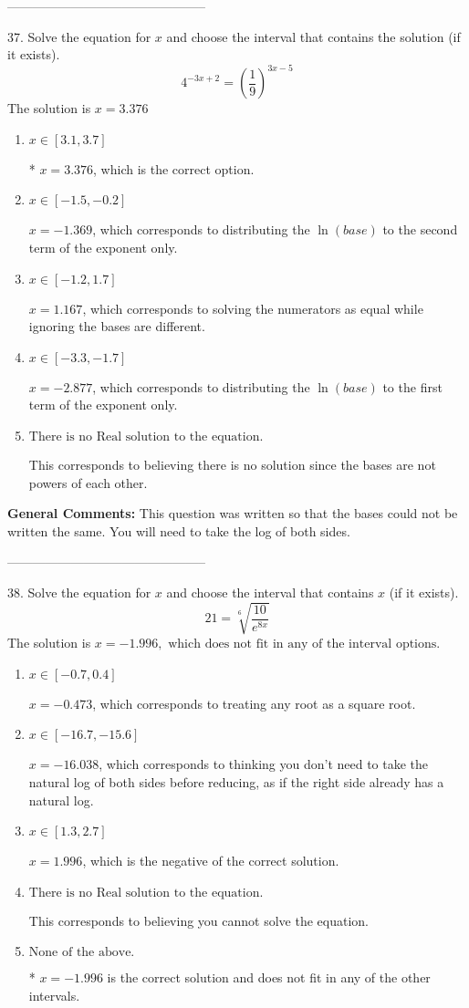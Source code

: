 \documentclass{article}[14pt]
\begin{document}
-----------------------------------------------

37. Solve the equation for $x$ and choose the interval that contains the solution (if it exists).
$$ 4^{-3x+2} = \left(\frac{1}{9}\right)^{3x-5} $$ 
The solution is $ x = 3.376 $ 

\begin{enumerate}[label=\Alph*.] 
\item $ x \in [3.1, 3.7] $ 

 * $x = 3.376$, which is the correct option. 
\item $ x \in [-1.5, -0.2] $ 

 $x = -1.369$, which corresponds to distributing the $\ln(base)$ to the second term of the exponent only. 
\item $ x \in [-1.2, 1.7] $ 

 $x = 1.167$, which corresponds to solving the numerators as equal while ignoring the bases are different. 
\item $ x \in [-3.3, -1.7] $ 

 $x = -2.877$, which corresponds to distributing the $\ln(base)$ to the first term of the exponent only. 
\item $ \text{There is no Real solution to the equation.} $ 

 This corresponds to believing there is no solution since the bases are not powers of each other. 
\end{enumerate} 
 
\textbf{General Comments:} This question was written so that the bases could not be written the same. You will need to take the log of both sides.

-----------------------------------------------

38.  Solve the equation for $x$ and choose the interval that contains $x$ (if it exists).
$$  21 = \sqrt[6]{\frac{10}{e^{8x}}} $$ 
The solution is $ x = -1.996, \text{ which does not fit in any of the interval options.} $ 

\begin{enumerate}[label=\Alph*.] 
\item $ x \in [-0.7, 0.4] $ 

 $x = -0.473$, which corresponds to treating any root as a square root. 
\item $ x \in [-16.7, -15.6] $ 

 $x = -16.038$, which corresponds to thinking you don't need to take the natural log of both sides before reducing, as if the right side already has a natural log. 
\item $ x \in [1.3, 2.7] $ 

 $x = 1.996$, which is the negative of the correct solution. 
\item $ \text{There is no Real solution to the equation.} $ 

 This corresponds to believing you cannot solve the equation. 
\item $ \text{None of the above.} $ 

 * $x = -1.996$ is the correct solution and does not fit in any of the other intervals. 
\end{enumerate} 
 
\end{document}

